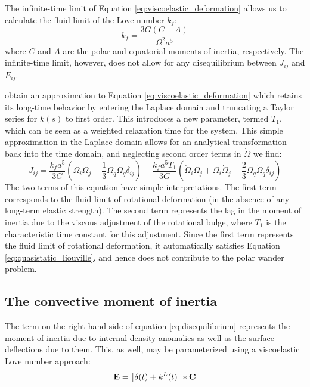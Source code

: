 \documentclass[extra,mreferee]{gji}
\begin{document}
The infinite-time limit of Equation \eqref{eq:viscoelastic_deformation} allows us to calculate the fluid limit of the Love number $k_f$:
\begin{equation}
k_f = \frac{3 G (C-A)}{\Omega^2 a^5}
\label{eq:fluid_love}
\end{equation}
where $C$ and $A$ are the polar and equatorial moments of inertia, respectively.
The infinite-time limit, however, does not allow for any disequilibrium between $J_{ij}$ and $E_{ij}$.

\citet{ricard1993polar} obtain an approximation to Equation \eqref{eq:viscoelastic_deformation} which retains its long-time behavior by entering the Laplace domain and truncating a Taylor series for $k(s)$ to first order.  
This introduces a new parameter, termed $T_1$, which can be seen as a weighted relaxation time for the system.  
This simple approximation in the Laplace domain allows for an analytical transformation back into the time domain, and neglecting second order terms in $\dot{\Omega}$ we find:
\begin{equation}
J_{ij} = \frac{k_f a^5}{3 G} \left( \Omega_i \Omega_j - \frac{1}{3} \Omega_q \Omega_q \delta_{ij} \right) -
 \frac{k_f a^5 T_1}{3G} \left(\dot{\Omega}_i \Omega_j + \Omega_i \dot{\Omega}_j - \frac{2}{3} \Omega_q \dot{\Omega}_q \delta_{ij} \right)
\label{eq:rotational_deformation}
\end{equation}
The two terms of this equation have simple interpretations.  
The first term corresponds to the fluid limit of rotational deformation (in the absence of any long-term elastic strength).  
The second term represents the lag in the moment of inertia due to the viscous adjustment of the rotational bulge, where $T_1$ is the characteristic time constant for this adjustment.
Since the first term represents the fluid limit of rotational deformation, it automatically satisfies Equation \eqref{eq:quasistatic_liouville}, and hence does not contribute to the polar wander problem.

\subsection{The convective moment of inertia}
\label{sec:convective_moment}

The term on the right-hand side of equation \eqref{eq:disequilibrium} represents the moment of inertia due to internal density anomalies as well as the surface deflections due to them.
This, as well, may be parameterized using a viscoelastic Love number approach:
\begin{equation} 
{\bf E} = \left[ \delta(t) + k^L(t) \right] * {\bf C}
\end{equation}
\end{document}
